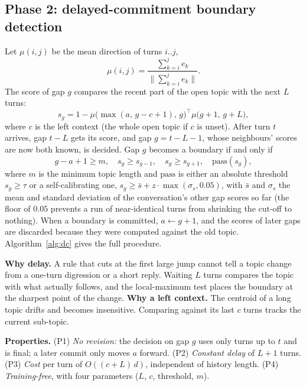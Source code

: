 \documentclass[journal]{IEEEtran}
\begin{document}
\subsection{Phase 2: delayed-commitment boundary detection}
Let $\mu(i,j)$ be the mean direction of turns $i..j$,
\begin{equation}
\mu(i,j)=\frac{\sum_{k=i}^{j} e_k}{\bigl\lVert\sum_{k=i}^{j} e_k\bigr\rVert}.
\end{equation}
The score of gap $g$ compares the recent part of the open topic with the next
$L$ turns:
\begin{equation}
s_g = 1-\mu\bigl(\max(a,\,g-c+1),\,g\bigr)^{\top}\mu\bigl(g+1,\,g+L\bigr),
\label{eq:score}
\end{equation}
where $c$ is the left context (the whole open topic if $c$ is unset). After
turn $t$ arrives, gap $t{-}L$ gets its score, and gap $g=t{-}L{-}1$, whose
neighbours' scores are now both known, is decided. Gap $g$ becomes a boundary
if and only if
\begin{equation}
g-a+1\ge m,\quad s_g\ge s_{g-1},\quad s_g\ge s_{g+1},\quad \mathrm{pass}(s_g),
\label{eq:rule}
\end{equation}
where $m$ is the minimum topic length and $\mathrm{pass}$ is either an absolute
threshold $s_g\ge\tau$ or a self-calibrating one,
$s_g\ge\bar{s}+z\cdot\max(\sigma_s,0.05)$, with $\bar{s}$ and $\sigma_s$ the
mean and standard deviation of the conversation's other gap scores so far
(the floor of $0.05$ prevents a run of near-identical turns from shrinking the
cut-off to nothing). When a boundary is committed, $a\leftarrow g{+}1$, and the
scores of later gaps are discarded because they were computed against the old
topic. Algorithm~\ref{alg:dc} gives the full procedure.

\textbf{Why delay.} A rule that cuts at the first large jump cannot tell a
topic change from a one-turn digression or a short reply. Waiting $L$ turns
compares the topic with what actually follows, and the local-maximum test
places the boundary at the sharpest point of the change. \textbf{Why a left
context.} The centroid of a long topic drifts and becomes insensitive. Comparing
against its last $c$ turns tracks the current sub-topic.

\textbf{Properties.} (P1) \emph{No revision:} the decision on gap $g$ uses only
turns up to $t$ and is final; a later commit only moves $a$ forward.
(P2) \emph{Constant delay} of $L{+}1$ turns. (P3) \emph{Cost} per turn of
$O((c+L)\,d)$, independent of history length. (P4) \emph{Training-free}, with
four parameters ($L$, $c$, threshold, $m$).
\end{document}
